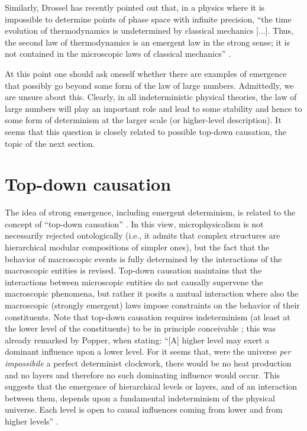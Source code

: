 \documentclass[12pt]{article}
\begin{document}
Similarly, Drossel has recently pointed out that, in a physics where it is impossible to determine points of phase space with infinite precision, ``the time evolution of thermodynamics is undetermined by classical mechanics [...]. Thus, the second law of thermodynamics is an emergent law in the strong sense; it is not contained in the microscopic laws of classical mechanics'' \cite{drossel}.


At this point one should ask oneself whether there are examples of emergence that possibly go beyond some form of the law of large numbers. Admittedly, we are unsure about this. Clearly, in all indeterministic physical theories, the law of large numbers will play an important role and lead to some stability and hence to some form of determinism at the larger scale (or higher-level description). It seems that this question is closely related to possible top-down causation, the topic of the next section.


\section{Top-down causation}
The idea of strong emergence, including emergent determinism, is related to the concept of ``top-down causation'' \cite{topdown, topdown2}. In this view, microphysicalism is not necessarily rejected ontologically (i.e., it admits that complex structures are hierarchical modular compositions of simpler ones), but the fact that the behavior of macroscopic events is fully determined by the interactions of the macroscopic entities is revised.  Top-down causation maintains that the interactions between microscopic entities do not causally supervene the macroscopic phenomena, but rather it posits a mutual interaction where also the macroscopic (strongly emergent) laws impose constraints on the behavior of their constituents. Note that top-down causation requires indeterminism (at least at the lower level of the constituents) to be in principle conceivable \cite{drosselnew}; this was already remarked by Popper, when stating: ``{[A] higher level may exert a dominant influence upon a lower level}. For it seems that, were the universe \emph{per impossibile} a perfect determinist clockwork, there would be no heat production and no layers and therefore no such dominating influence would occur. This suggests that the emergence of hierarchical levels or layers, and of an interaction between them, depends upon a fundamental indeterminism of the physical universe. Each level is open to causal influences coming from lower and from higher levels'' \cite{poppernew}.
\end{document}
